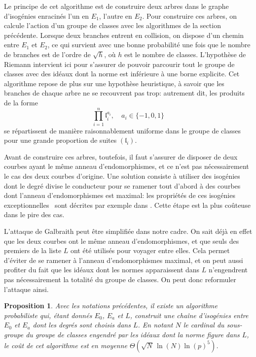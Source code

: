 \documentclass[11pt,a4paper]{article}
\renewcommand{\frak}{\mathfrak}
\renewcommand{\v}{\vspace{5mm}}
\newtheorem*{prop}{Proposition}
\theoremstyle{definition}
\begin{document}
Le principe de cet algorithme est de construire deux arbres dans le graphe d'isogénies enracinés l'un en $E_1$, l'autre en $E_2$. Pour construire ces arbres, on calcule l'action d'un groupe de classes avec les algorithmes de la section précédente. Lorsque deux branches entrent en collision, on dispose d'un chemin entre $E_1$ et $E_2$, ce qui survient avec une bonne probabilité une fois que le nombre de branches est de l'ordre de $\sqrt{h}$, où $h$ est le nombre de classes. L'hypothèse de Riemann intervient ici pour s'assurer de pouvoir parcourir tout le groupe de classes avec des idéaux dont la norme est inférieure à une borne explicite. Cet algorithme repose de plus sur une hypothèse heuristique, à savoir que les branches de chaque arbre ne se recouvrent pas trop: autrement dit, les produits de la forme
$$\prod_{i = 1}^n {\frak l}_i^{a_i}, \quad a_i\in \{-1,0,1\}$$
se répartissent de manière raisonnablement uniforme dans le groupe de classes pour une grande proportion de suites $({\frak l}_i)$.

Avant de construire ces arbres, toutefois, il faut s'assurer de disposer de deux courbes ayant le même anneau d'endomorphismes, et ce n'est pas nécessairement le cas des deux courbes d'origine. Une solution consiste à utiliser des isogénies dont le degré divise le conducteur pour se ramener tout d'abord à des courbes dont l'anneau d'endomorphismes est maximal: les propriétés de ces isogénies \og exceptionnelles \fg\ sont décrites par exemple dans \cite{Kohel}. Cette étape est la plus coûteuse dans le pire des cas.
\v

L'attaque de Galbraith peut être simplifiée dans notre cadre. On sait déjà en effet que les deux courbes ont le même anneau d'endomorphismes, et que seuls des premiers de la liste $L$ ont été utilisés pour voyager entre elles. Cela permet d'éviter de se ramener à l'anneau d'endomorphismes maximal, et on peut aussi profiter du fait que les idéaux dont les normes apparaissent dans $L$ n'engendrent pas nécessairement la totalité du groupe de classes. On peut donc reformuler l'attaque ainsi.

\begin{prop}
Avec les notations précédentes, il existe un algorithme probabiliste qui, étant donnés $E_0$, $E_a$ et $L$, construit une chaîne d'isogénies entre $E_0$ et $E_a$ dont les degrés sont choisis dans $L$. En notant $N$ le cardinal du sous-groupe du groupe de classes engendré par les idéaux dont la norme figure dans $L$, le coût de cet algorithme est en moyenne $\Theta(\sqrt{N}\, \ln(N) \ln(p)^5)$.
\end{prop}
\end{document}
